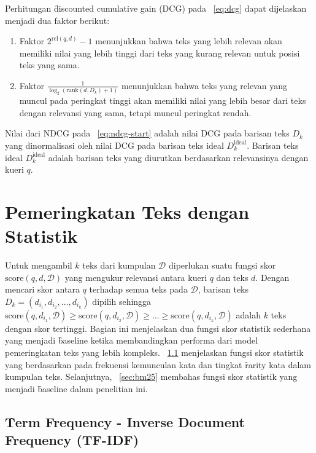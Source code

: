         Perhitungan \f{discounted cumulative gain} (DCG) pada \equ~\ref{eq:dcg} dapat dijelaskan menjadi dua faktor berikut:
        \begin{enumerate}
            \item Faktor $2^{\text{rel}(q, d)} - 1$ menunjukkan bahwa teks yang lebih relevan akan memiliki nilai yang lebih tinggi dari teks yang kurang relevan untuk posisi teks yang sama.
            \item Faktor $\frac{1}{\log_2(\text{rank}(d, D_k) + 1)}$ menunjukkan bahwa teks yang relevan yang muncul pada peringkat tinggi akan memiliki nilai yang lebih besar dari teks dengan relevansi yang sama, tetapi muncul peringkat rendah.
        \end{enumerate}

        Nilai dari NDCG pada \equ~\ref{eq:ndcg-start} adalah nilai DCG pada barisan teks $D_k$ yang dinormalisasi oleh nilai DCG pada barisan teks ideal $D_k^{\text{ideal}}$. Barisan teks ideal $D_k^{\text{ideal}}$ adalah barisan teks yang diurutkan berdasarkan relevansinya dengan kueri $q$.


\section{Pemeringkatan Teks dengan Statistik}
        Untuk mengambil $k$ teks dari kumpulan $\mathcal{D}$ diperlukan suatu fungsi skor $\text{score}(q, d, \mathcal{D})$ yang mengukur relevansi antara kueri $q$ dan teks $d$. Dengan mencari skor antara $q$ terhadap semua teks pada $\mathcal{D}$, barisan teks $D_k = (d_{i_1}, d_{i_2},\dots, d_{i_k})$ dipilih sehingga $\text{score}(q, d_{i_1},\mathcal{D}) \geq \text{score}(q, d_{i_2}, \mathcal{D}) \geq \dots \geq \text{score}(q, d_{i_k},\mathcal{D})$ adalah $k$ teks dengan skor tertinggi.
        Bagian ini menjelaskan dua fungsi skor statistik sederhana yang menjadi \f{baseline} ketika membandingkan performa dari model pemeringkatan teks yang lebih kompleks. \sect~\ref{sec:tfidf} menjelaskan fungsi skor statistik yang berdasarkan pada frekuensi kemunculan kata dan tingkat \f{rarity} kata dalam kumpulan teks. Selanjutnya, \sect~\ref{sec:bm25} membahas fungsi skor statistik yang menjadi \f{baseline} dalam penelitian ini.
    \subsection{\f{Term Frequency - Inverse Document Frequency} (TF-IDF)}
    \label{sec:tfidf}
 
